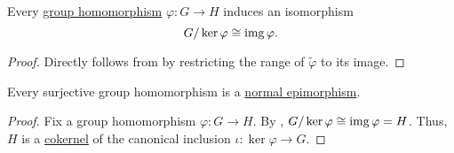 \begin{corollary}\label{thm:quotient_group_by_kernel}
  Every \hyperref[def:group/homomorphism]{group homomorphism} \( \varphi: G \to H \) induces an isomorphism
  \begin{equation*}
    G / \ker \varphi \cong \operatorname{img} \varphi.
  \end{equation*}
\end{corollary}
\begin{proof}
  Directly follows from  by restricting the range of \( \widetilde{\varphi} \) to its image.
\end{proof}

\begin{corollary}\label{thm:group_epimorphisms_are_normal}
  Every surjective group homomorphism is a \hyperref[def:zero_morphisms/cokernel]{normal epimorphism}.
\end{corollary}
\begin{proof}
  Fix a group homomorphism \( \varphi: G \to H \). By , \( G / \ker \varphi \cong \operatorname{img} \varphi = H \). Thus, \( H \) is a \hyperref[def:zero_morphisms/cokernel]{cokernel} of the canonical inclusion \( \iota: \ker \varphi \to G \).
\end{proof}

